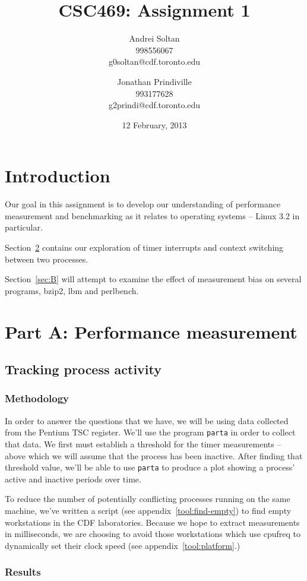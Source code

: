 \documentclass{article}
\author{Andrei Soltan\\998556067\\g0soltan@cdf.toronto.edu
\and Jonathan Prindiville\\993177628\\g2prindi@cdf.toronto.edu}
\title{CSC469: Assignment 1}
\date{12 February, 2013}
\begin{document}
\maketitle

\tableofcontents

\newpage
\section{Introduction}
Our goal in this assignment is to develop our understanding of performance
measurement and benchmarking as it relates to operating systems -- Linux 3.2
in particular.

Section~\ref{sec:A} contains our exploration of timer interrupts and context
switching between two processes.

Section~\ref{sec:B} will attempt to examine the effect of measurement bias
on several programs, bzip2, lbm and perlbench.

\section{Part A: Performance measurement}
\label{sec:A}
\subsection{Tracking process activity}

\subsubsection{Methodology}
In order to answer the questions that we have, we will be using data collected
from the Pentium TSC register. We'll use the program \lstinline{parta} in order
to collect that data. We first must establish a threshold for the timer
measurements -- above which we will assume that the process has been inactive.
After finding that threshold value, we'll be able to use \lstinline{parta} to
produce a plot showing a process' active and inactive periods over time.

To reduce the number of potentially conflicting processes running on the same
machine, we've written a script (see appendix~\ref{tool:find-empty})
to find empty workstations in the CDF laboratories. Because we hope to extract
measurements in milliseconds, we are choosing to avoid those workstations which
use cpufreq to dynamically set their clock speed (see appendix~\ref{tool:platform}.)

\subsubsection{Results}
\end{document}
